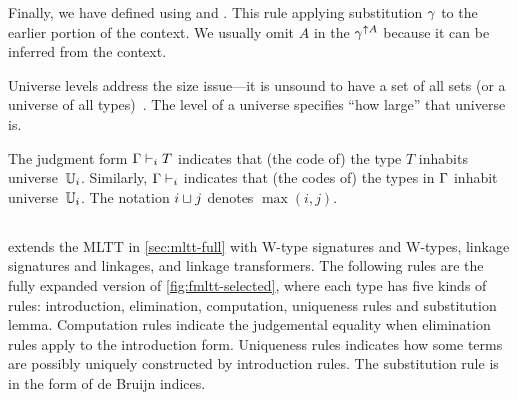 Finally, we have  defined using  and . This rule applying substitution $\gm$ to the earlier portion of the context. We usually omit $A$ in the $\gm^{\uparrow A}$ because it can be inferred from the context.




Universe levels address the size issue---it is unsound to have a set of all sets
(or a universe of all types)~\cite{hurkens1995simplification}.
The level of a universe specifies ``how large'' that universe is.

The judgment form $\goodType{\Gm}{T}{i}$ indicates that (the code of) the type $T$
inhabits universe~$\cU_i$.
Similarly, $\goodCtx{\Gm}{i}$ indicates that (the codes of) the types in $\Gm$
inhabit universe~$\cU_i$.
The notation $i \lcup j$ denotes $\max(i,j)$.



\subsection{\TT}
\label{sec:fmltt-full}

\TT extends the MLTT in \cref{sec:mltt-full} with W-type signatures and W-types,
linkage signatures and linkages, and linkage transformers. The following rules are the fully expanded version of \cref{fig:fmltt-selected}, where each type has five kinds of rules: introduction, elimination, computation, uniqueness rules and substitution lemma. 
Computation rules indicate the judgemental equality when elimination rules apply to the introduction form. Uniqueness rules indicates how some terms are possibly uniquely constructed by introduction rules. The substitution rule is in the form of de Bruijn indices.

